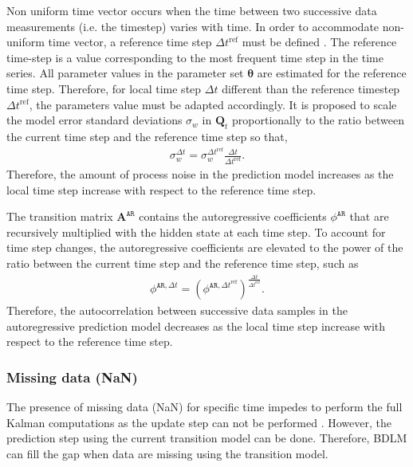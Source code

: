 Non uniform time vector occurs when the time between two successive data measurements (i.e. the timestep) varies with time.
In order to accommodate non-uniform time vector, a reference time step $\Delta t^{\text{ref}} $ must be defined \cite{STC:STC2035}. 
The reference time-step is a value corresponding to the most frequent time step in the time series.
All parameter values in the parameter set $\bm \theta$ are estimated for the reference time step. 
Therefore, for local time step $\Delta t$ different than the reference timestep $\Delta t^{\text{ref}} $, the parameters value must be adapted accordingly.
It is proposed to scale the model error standard deviations $\sigma_{w}$ in $\mathbf{Q}_{t}$  proportionally to the ratio between the current time step and the reference time step so that,
\begin{gather*}
\sigma_{w}^{\Delta t}= \sigma_{w}^{\Delta t ^{\text{ref}}}\frac{\Delta t}{\Delta t ^{\text{ref}}}.
\end{gather*}
Therefore, the amount of process noise in the prediction model increases as the local time step increase with respect to the reference time step.

The transition matrix $\mathbf{A}^{\mathtt{AR}}$ contains the autoregressive coefficients $\phi^{\mathtt{AR}}$ that are recursively multiplied with the hidden state at each time step. 
To account for time step changes, the autoregressive coefficients are elevated to the power of the ratio between the current time step and the reference time step, such as
\begin{gather*}
\phi^{\mathtt{AR}, \Delta t}=  (\phi^{\mathtt{AR}, \Delta t ^{\text{ref}}})^{\frac{\Delta t}{\Delta t ^{\text{ref}}}}.
\end{gather*}
Therefore, the autocorrelation between successive data samples in the autoregressive prediction model decreases as the local time step increase with respect to the reference time step.

\subsubsection{Missing data (NaN)}

The presence of missing data (NaN) for specific time impedes to perform the full Kalman computations as the update step can not be performed \cite{STC:STC2035}.
However, the prediction step using the current transition model can be done.
Therefore, BDLM can fill the gap when data are missing using the transition model.


